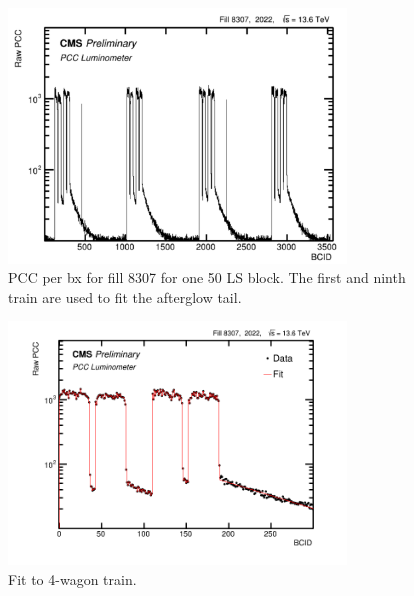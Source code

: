 \begin{figure}[!htp]
\centering
\includegraphics[width=0.8\textwidth]{ashish_thesis/run_361957_ls_block_1.png}
\caption[Raw PCC run 361957]{%
 PCC per bx for fill 8307 for one 50 LS block. The first and ninth train are used to fit the afterglow tail.
}
\label{fig:period_bound_101}
\end{figure}

\begin{figure}[!htp]
\centering
\includegraphics[width=0.8\textwidth]{ashish_thesis/afterglow_fit_2022_1.png}
\caption[Afterglow fit 4-wagon]{%
 Fit to 4-wagon train.
}
\label{fig:period_bound_102}
\end{figure}

